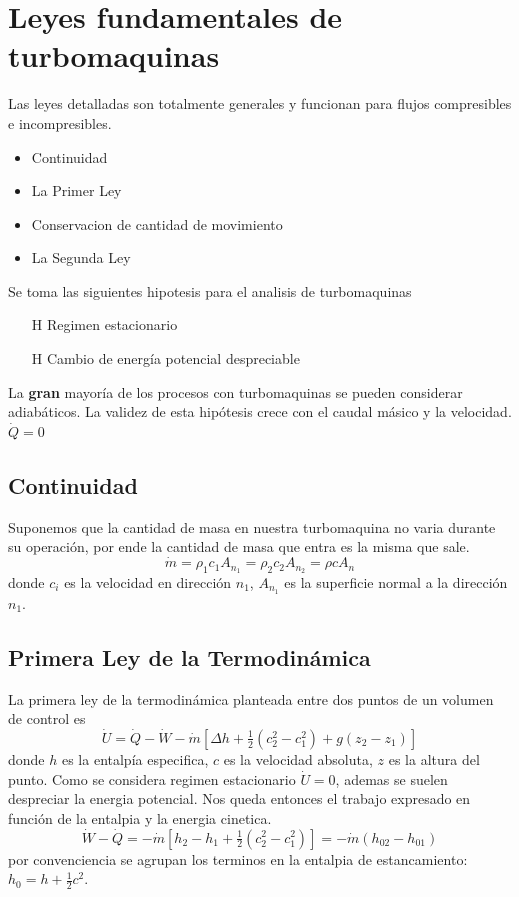 \documentclass{article}
\newcommand{\dQ}{\dot{Q}}
\newcommand{\dU}{\dot{U}}
\newcommand{\dW}{\dot{W}}
\newcommand{\dm}{\dot{m}}
\begin{document}
\section{Leyes fundamentales de turbomaquinas}
Las leyes detalladas son totalmente generales y funcionan para flujos compresibles e incompresibles.
\begin{itemize}
    \item Continuidad
    \item La Primer Ley
    \item Conservacion de cantidad de movimiento
    \item La Segunda Ley
\end{itemize}
Se toma las siguientes hipotesis para el analisis de turbomaquinas
\begin{itemize}
    \item[H] Regimen estacionario
    \item[H] Cambio de energía potencial despreciable
\end{itemize}

La \textbf{gran} mayoría de los procesos con turbomaquinas se pueden considerar adiabáticos. La validez de esta hipótesis crece con el caudal másico y la velocidad. $\dQ=0$ 

\subsection{Continuidad}
Suponemos que la cantidad de masa en nuestra turbomaquina no varia durante su operación, por ende la cantidad de masa que entra es la misma que sale.
\[
\dm = \rho_1 c_1 A_{n_1} = \rho_2 c_2 A_{n_2} = \rho c A_n
\]
donde $c_i$ es la velocidad en dirección $n_1$, $A_{n_1}$ es la superficie normal a la dirección $n_1$.

\subsection{Primera Ley de la Termodinámica}
La primera ley de la termodinámica planteada entre dos puntos de un volumen de control es
\[
\dU = \dQ - \dW - \dm \left[\Delta h + \tfrac{1}{2}(c_2^2-c_1^2) + g(z_2 - z_1)\right]
\]
donde $h$ es la entalpía especifica, $c$ es la velocidad absoluta, $z$ es la altura del punto. Como se considera regimen estacionario $\dU=0$, ademas se suelen despreciar la energia potencial. Nos queda entonces el trabajo expresado en función de la entalpia y la energia cinetica.
\begin{equation} \label{ec:PrimeraLeyTurbomaquinas}
    \dW - \dQ = - \dm \left[ h_2-h_1 +\tfrac{1}{2}(c_2^2-c_1^2) \right] = - \dm (h_{02} - h_{01})
\end{equation}
por convenciencia se agrupan los terminos en la entalpia de estancamiento: $h_0 = h+\tfrac{1}{2}c^2$.
\end{document}
